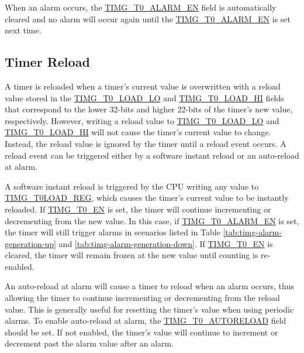 \documentclass[main\_\_EN.tex]{subfiles}
\begin{document}
When an alarm occurs, the \hyperref[fielddesc:TIMGTXALARMEN]{TIMG\_T0\_ALARM\_EN} field is automatically cleared and no alarm will occur again until the \hyperref[fielddesc:TIMGTXALARMEN]{TIMG\_T0\_ALARM\_EN} is set next time.

\subsection{Timer Reload} \label{sec:timg-func-descr-reload}

A timer is reloaded when a timer's current value is overwritten with a reload value stored in the \hyperref[fielddesc:TIMGTXLOADLO]{TIMG\_T0\_LOAD\_LO} and \hyperref[fielddesc:TIMGTXLOADHI]{TIMG\_T0\_LOAD\_HI} fields that correspond to the lower 32-bits and higher 22-bits of the timer's new value, respectively. However, writing a reload value to \hyperref[fielddesc:TIMGTXLOADLO]{TIMG\_T0\_LOAD\_LO} and \hyperref[fielddesc:TIMGTXLOADHI]{TIMG\_T0\_LOAD\_HI} will not cause the timer's current value to change. Instead, the reload value is ignored by the timer until a reload event occurs. A reload event can be triggered either by a software instant reload or an auto-reload at alarm.

A software instant reload is triggered by the CPU writing any value to \hyperref[regdesc:TIMGTXLOADREG]{TIMG\_T0LOAD\_REG}, which causes the timer's current value to be instantly reloaded. If \hyperref[fielddesc:TIMGTXEN]{TIMG\_T0\_EN} is set, the timer will continue incrementing or decrementing from the new value. In this case, if \hyperref[fielddesc:TIMGTXALARMEN]{TIMG\_T0\_ALARM\_EN} is set, the timer will still trigger alarms in scenarios listed in Table \ref{tab:timg-alarm-generation-up} and \ref{tab:timg-alarm-generation-down}. If \hyperref[fielddesc:TIMGTXEN]{TIMG\_T0\_EN} is cleared, the timer will remain frozen at the new value until counting is re-enabled.

An auto-reload at alarm will cause a timer to reload when an alarm occurs, thus allowing the timer to continue incrementing or decrementing from the reload value. This is generally useful for resetting the timer's value when using periodic alarms. To enable auto-reload at alarm, the \hyperref[fielddesc:TIMGTXAUTORELOAD]{TIMG\_T0\_AUTORELOAD} field should be set. If not enabled, the timer's value will continue to increment or decrement past the alarm value after an alarm.
\end{document}
